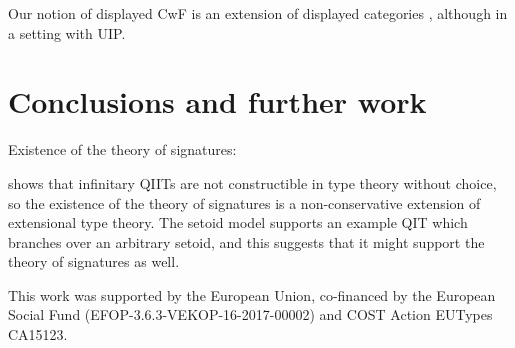 \documentclass[sigplan,review,anonymous]{acmart}\settopmatter{printfolios=true,printccs=false,printacmref=false}
\begin{document}
Our notion of displayed CwF is an extension of displayed categories
\cite{displayedcats}, although in a setting with UIP.

\section{Conclusions and further work}
\label{sec:conclusion}



Existence of the theory of signatures:

\cite[Section 9]{lumsdaineShulman} shows that infinitary QIITs are not
constructible in type theory without choice, so the existence of the
theory of signatures is a non-conservative extension of extensional
type theory. The setoid model supports an example QIT which branches
over an arbitrary setoid, and this suggests that it might support the
theory of signatures as well.

\begin{acks}
This work was supported by the European Union, co-financed by the
European Social Fund (EFOP-3.6.3-VEKOP-16-2017-00002) and COST Action
EUTypes CA15123.
\end{acks}



\end{document}
